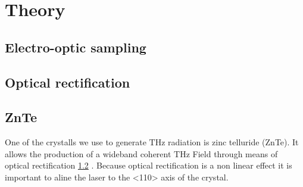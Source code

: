 \chapter{Theory}

\section{Electro-optic sampling}\label{sec:eos}

\section{Optical rectification}\label{sec:optic_ref}


\section{ZnTe}
One of the crystalls we use to generate $\si{\tera\hertz}$ radiation is zinc telluride (ZnTe). 
It allows the production of a wideband coherent $\si{\tera\hertz}$ Field through means of optical rectification \ref{sec:optic_ref} \cite{ZnTe_Nahata_Weling_1996}.
Because optical rectification is a non linear effect it is important to aline the laser to the <110> axis of the crystal.


